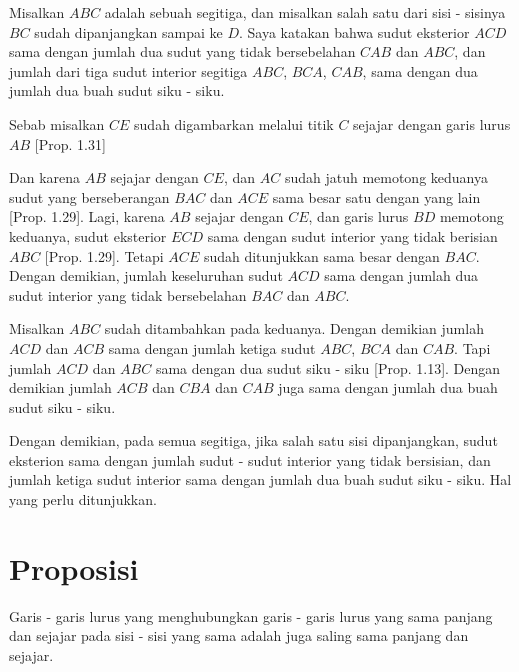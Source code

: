\documentclass[a4paper]{book}
\begin{document}
Misalkan $ABC$ adalah sebuah segitiga, dan misalkan salah satu dari sisi - 
sisinya $BC$ sudah dipanjangkan sampai ke $D$. Saya katakan bahwa sudut 
eksterior $ACD$ sama dengan jumlah dua sudut yang tidak bersebelahan $CAB$ dan
$ABC$, dan jumlah dari tiga sudut interior segitiga $ABC$, $BCA$, $CAB$, 
sama dengan dua jumlah dua buah sudut siku - siku.

Sebab misalkan $CE$ sudah digambarkan melalui titik $C$ sejajar dengan garis
lurus $AB$ [Prop. 1.31]

Dan karena $AB$ sejajar dengan $CE$, dan $AC$ sudah jatuh memotong keduanya 
sudut yang berseberangan $BAC$ dan $ACE$ sama besar satu dengan yang lain
[Prop. 1.29]. Lagi, karena $AB$ sejajar dengan $CE$, dan garis lurus $BD$
memotong keduanya, sudut eksterior $ECD$ sama dengan sudut interior yang 
tidak berisian $ABC$ [Prop. 1.29]. Tetapi $ACE$ sudah ditunjukkan sama besar
dengan $BAC$. Dengan demikian, jumlah keseluruhan sudut $ACD$ sama dengan
jumlah dua sudut interior yang tidak bersebelahan $BAC$ dan $ABC$.

Misalkan $ABC$ sudah ditambahkan pada keduanya. Dengan demikian jumlah
$ACD$ dan $ACB$ sama dengan jumlah ketiga sudut $ABC$, $BCA$ dan $CAB$. Tapi
jumlah $ACD$ dan $ABC$ sama dengan dua sudut siku - siku [Prop. 1.13].
Dengan demikian jumlah $ACB$ dan $CBA$ dan $CAB$ juga sama dengan jumlah
dua buah sudut siku - siku.

Dengan demikian, pada semua segitiga, jika salah satu sisi dipanjangkan, sudut
eksterion sama dengan jumlah sudut - sudut interior yang tidak bersisian, dan 
jumlah ketiga sudut interior sama dengan jumlah dua buah sudut siku - siku.
Hal yang perlu ditunjukkan.

\section*{\centering Proposisi \thesection} 
Garis - garis lurus yang menghubungkan garis - garis lurus yang sama panjang dan 
sejajar pada sisi - sisi yang sama adalah juga saling sama panjang dan sejajar.
\begin{center}
\end{center}
\end{document}
